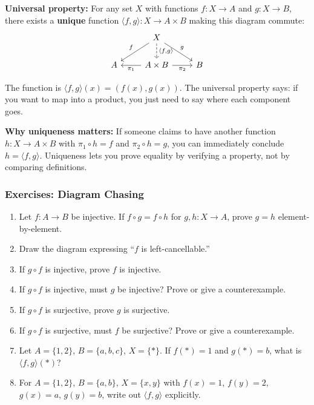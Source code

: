 \begin{goingdeeper}
\textbf{Universal property:} For any set $X$ with functions $f: X \to A$ and $g: X \to B$, there exists a \textbf{unique} function $\langle f, g \rangle: X \to A \times B$ making this diagram commute:
\[
\begin{tikzcd}
 & X \arrow[dl, "f"'] \arrow[d, dashed, "{\langle f, g \rangle}"] \arrow[dr, "g"] & \\
A & A \times B \arrow[l, "\pi_1"] \arrow[r, "\pi_2"'] & B
\end{tikzcd}
\]

The function is $\langle f, g \rangle(x) = (f(x), g(x))$. The universal property says: if you want to map into a product, you just need to say where each component goes.

\textbf{Why uniqueness matters:} If someone claims to have another function $h: X \to A \times B$ with $\pi_1 \circ h = f$ and $\pi_2 \circ h = g$, you can immediately conclude $h = \langle f, g \rangle$. Uniqueness lets you prove equality by verifying a property, not by comparing definitions.

\subsubsection*{Exercises: Diagram Chasing}

\begin{enumerate}
  \item Let $f: A \to B$ be injective. If $f \circ g = f \circ h$ for $g, h: X \to A$, prove $g = h$ element-by-element.

  \item Draw the diagram expressing ``$f$ is left-cancellable.''

  \item If $g \circ f$ is injective, prove $f$ is injective.

  \item If $g \circ f$ is injective, must $g$ be injective? Prove or give a counterexample.

  \item If $g \circ f$ is surjective, prove $g$ is surjective.

  \item If $g \circ f$ is surjective, must $f$ be surjective? Prove or give a counterexample.

  \item Let $A = \{1, 2\}$, $B = \{a, b, c\}$, $X = \{*\}$. If $f(*) = 1$ and $g(*) = b$, what is $\langle f, g \rangle(*)$?

  \item For $A = \{1, 2\}$, $B = \{a, b\}$, $X = \{x, y\}$ with $f(x) = 1$, $f(y) = 2$, $g(x) = a$, $g(y) = b$, write out $\langle f, g \rangle$ explicitly.


\end{enumerate}
\end{goingdeeper}
